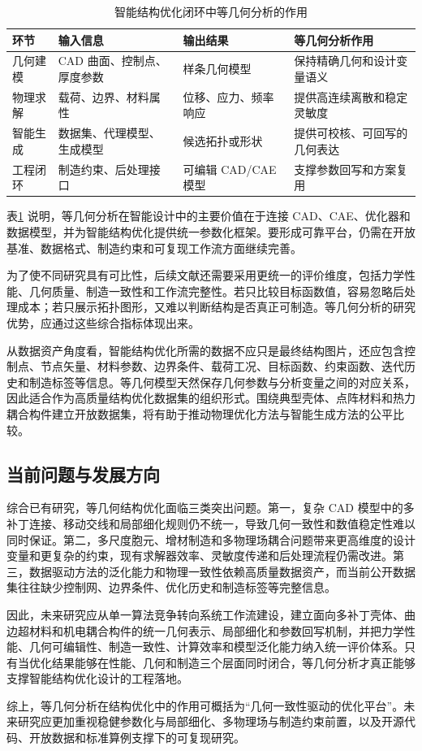 \begin{table}[H]
    \caption{智能结构优化闭环中等几何分析的作用}
    \label{tab:intelligent_loop}
    \centering
    \scriptsize
    \setlength{\tabcolsep}{2.8pt}
    \renewcommand{\arraystretch}{1.14}
    \begin{tabular}{p{}p{}p{}p{}}\toprule
        环节 & 输入信息 & 输出结果 & 等几何分析作用 \\\midrule
        几何建模 & CAD 曲面、控制点、厚度参数 & 样条几何模型 & 保持精确几何和设计变量语义 \\
        物理求解 & 载荷、边界、材料属性 & 位移、应力、频率响应 & 提供高连续离散和稳定灵敏度 \\
        智能生成 & 数据集、代理模型、生成模型 & 候选拓扑或形状 & 提供可校核、可回写的几何表达 \\
        工程闭环 & 制造约束、后处理接口 & 可编辑 CAD/CAE 模型 & 支撑参数回写和方案复用 \\\bottomrule
    \end{tabular}
\end{table}

表\ref{tab:intelligent_loop} 说明，等几何分析在智能设计中的主要价值在于连接 CAD、CAE、优化器和数据模型，并为智能结构优化提供统一参数化框架。要形成可靠平台，仍需在开放基准、数据格式、制造约束和可复现工作流方面继续完善\cite{Wu2021SMO,Zhao2024ArXivOpenSource,Wen2022LXXB}。

为了使不同研究具有可比性，后续文献还需要采用更统一的评价维度，包括力学性能、几何质量、制造一致性和工作流完整性。若只比较目标函数值，容易忽略后处理成本；若只展示拓扑图形，又难以判断结构是否真正可制造。等几何分析的研究优势，应通过这些综合指标体现出来。

从数据资产角度看，智能结构优化所需的数据不应只是最终结构图片，还应包含控制点、节点矢量、材料参数、边界条件、载荷工况、目标函数、约束函数、迭代历史和制造标签等信息。等几何模型天然保存几何参数与分析变量之间的对应关系，因此适合作为高质量结构优化数据集的组织形式。围绕典型壳体、点阵材料和热力耦合构件建立开放数据集，将有助于推动物理优化方法与智能生成方法的公平比较。

\subsection{当前问题与发展方向}

综合已有研究，等几何结构优化面临三类突出问题。第一，复杂 CAD 模型中的多补丁连接、移动交线和局部细化规则仍不统一，导致几何一致性和数值稳定性难以同时保证\cite{Zhao2024ArXivIntersections}。第二，多尺度胞元、增材制造和多物理场耦合问题带来更高维度的设计变量和更复杂的约束，现有求解器效率、灵敏度传递和后处理流程仍需改进\cite{Bai2024JME,WangQi2024HKXB}。第三，数据驱动方法的泛化能力和物理一致性依赖高质量数据资产，而当前公开数据集往往缺少控制网、边界条件、优化历史和制造标签等完整信息。

因此，未来研究应从单一算法竞争转向系统工作流建设，建立面向多补丁壳体、曲边超材料和机电耦合构件的统一几何表示、局部细化和参数回写机制，并把力学性能、几何可编辑性、制造一致性、计算效率和模型泛化能力纳入统一评价体系。只有当优化结果能够在性能、几何和制造三个层面同时闭合，等几何分析才真正能够支撑智能结构优化设计的工程落地。

综上，等几何分析在结构优化中的作用可概括为“几何一致性驱动的优化平台”。未来研究应更加重视稳健参数化与局部细化、多物理场与制造约束前置，以及开源代码、开放数据和标准算例支撑下的可复现研究。

